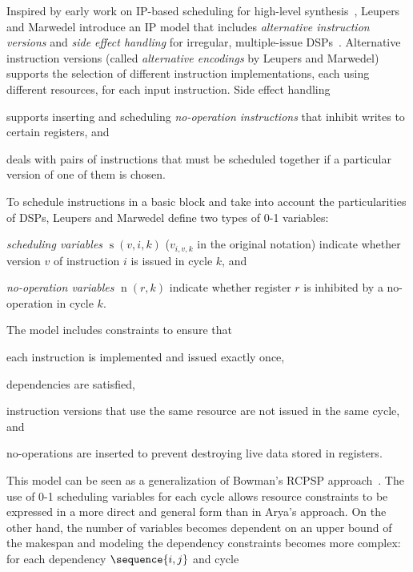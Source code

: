 \documentclass[acmsmall,authorversion,nonacm]{acmart}
\newcommand{\noMathVar}[2]{\operatorname{#1}(#2)}
\newcommand{\var}[2]{$\noMathVar{#1}{#2}$}
\begin{document}
Inspired by early work on IP-based scheduling for high-level
synthesis~\cite{Hwang1991,Gebotys1991}, Leupers and Marwedel introduce
an IP model that includes \emph{alternative instruction versions} and
\emph{side effect handling} for irregular, multiple-issue
DSPs~\cite{Leupers1997}.
Alternative instruction versions (called \emph{alternative encodings}
by Leupers and Marwedel) supports the selection of different
instruction implementations, each using different resources, for each
input instruction.
Side effect handling
\begin{inparaitem}[]
\item supports inserting and scheduling \emph{no-operation
  instructions} that inhibit writes to certain registers, and
\item deals with pairs of instructions that must be scheduled together
  if a particular version of one of them is chosen.
\end{inparaitem}
To schedule instructions in a basic block and take into account the
particularities of DSPs, Leupers and Marwedel define two types of 0-1
variables:
\begin{inparaitem}[]
\item \emph{scheduling variables} \var{s}{v,i,k} ($v_{i,v,k}$ in the
  original notation) indicate whether version $v$ of instruction $i$
  is issued in cycle $k$, and
\item \emph{no-operation variables} \var{n}{r,k} indicate whether
  register $r$ is inhibited by a no-operation in cycle $k$.
\end{inparaitem}
The model includes constraints to ensure that
\begin{inparaitem}[]
\item each instruction is implemented and issued exactly once,
\item dependencies are satisfied,
\item instruction versions that use the same resource are not issued
  in the same cycle, and
\item no-operations are inserted to prevent destroying live data
  stored in registers.
\end{inparaitem}
This model can be seen as a generalization of Bowman's RCPSP
approach~\cite{Bowman1959}.
The use of 0-1 scheduling variables for each cycle allows resource
constraints to be expressed in a more direct and general form than in
Arya's approach.
On the other hand, the number of variables becomes dependent on an
upper bound of the makespan and modeling the dependency constraints
becomes more complex: for each dependency $\sequence{i,j}$ and cycle
\end{document}

